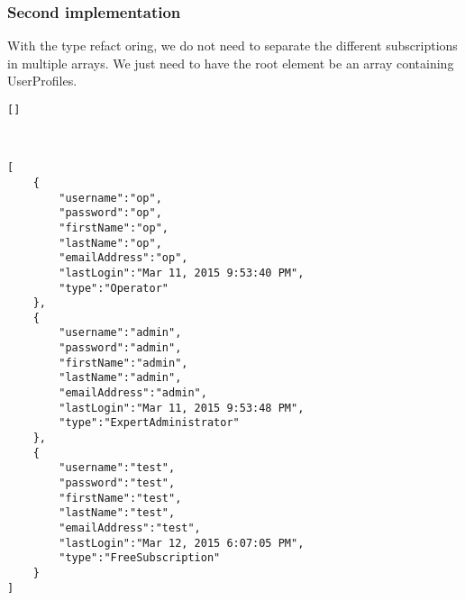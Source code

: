 \subsubsection{Second implementation}

With the type refact    oring, we do not need to separate the different
subscriptions in multiple arrays. We just need to have the root element
be an array containing UserProfiles.

\begin{lstlisting}[caption={empty users.json document}]
[]
\end{lstlisting}
\

\begin{lstlisting}[caption={users.json example}]
[
    {
        "username":"op",
        "password":"op",
        "firstName":"op",
        "lastName":"op",
        "emailAddress":"op",
        "lastLogin":"Mar 11, 2015 9:53:40 PM",
        "type":"Operator"
    },
    {
        "username":"admin",
        "password":"admin",
        "firstName":"admin",
        "lastName":"admin",
        "emailAddress":"admin",
        "lastLogin":"Mar 11, 2015 9:53:48 PM",
        "type":"ExpertAdministrator"
    },
    {
        "username":"test",
        "password":"test",
        "firstName":"test",
        "lastName":"test",
        "emailAddress":"test",
        "lastLogin":"Mar 12, 2015 6:07:05 PM",
        "type":"FreeSubscription"
    }
]
\end{lstlisting}
